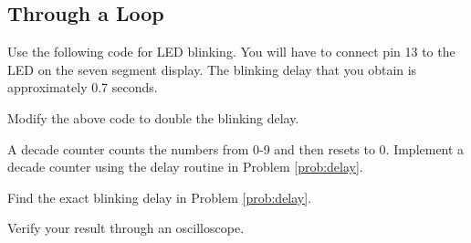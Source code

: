 

\subsection{Through a Loop}
%
%

\begin{problem}
\label{prob:delay}
Use the following code for LED blinking. You will have to connect pin 13 to the LED on the seven segment display.  The blinking delay that you obtain is approximately 0.7 seconds.
\end{problem}

%
\begin{problem}
Modify the above code to double the blinking delay.
\end{problem}
%
\begin{problem}
A decade counter counts the numbers from 0-9 and then resets to 0. Implement a decade counter using the delay routine in Problem \ref{prob:delay}.
\end{problem}
%
\begin{problem}
Find the exact blinking delay in Problem \ref{prob:delay}.  
\end{problem}
%
\begin{problem}
Verify your result through an oscilloscope. 
\end{problem}


